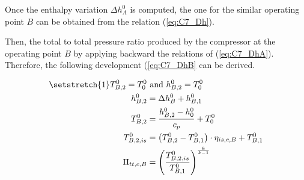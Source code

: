Once the enthalpy variation $\Delta h_A^0$ is computed, the one for the similar operating point $B$ can be obtained from the relation (\ref{eq:C7_Dh}).

Then, the total to total pressure ratio produced by the compressor at the operating point $B$ by applying backward the relations of (\ref{eq:C7_DhA}). Therefore, the following development (\ref{eq:C7_DhB} can be derived.

\begin{align}
\setstretch{1}
    T_{B,2}^0 = T_{0}^0 &\text{ and } h_{B,2}^0 = T_{0}^0\nonumber\\
    h_{B,2}^0 &= \Delta h_B^0 + h_{B,1}^0\nonumber\\
    T_{B,2}^0 &= \frac{h_{B,2}^0 - h_{0}^0}{c_p} + T_0^0\label{eq:C7_DhB}\\
    T_{B,2,is}^0 &= \left(T_{B,2}^0 - T_{B,1}^0\right)\cdot \eta_{is,c,B} + T_{B,1}^0\nonumber\\
    \Pi_{tt,c,B} &= \left(\frac{T_{B,2,is}^0}{T_{B,1}^0}\right)^{\frac{k}{k-1}}\nonumber
\end{align}

